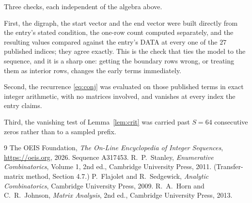 \documentclass[11pt,a4paper]{article}
\theoremstyle{plain}
\theoremstyle{definition}
\begin{document}
Three checks, each independent of the algebra above.

First, the digraph, the start vector and the end vector were built directly from the
entry's stated condition, the one-row count computed separately, and the resulting values
compared against the entry's DATA at every one of the $27$ published indices; they
agree exactly. This is the check that ties the model to the sequence, and it is a sharp one:
getting the boundary rows wrong, or treating them as interior rows, changes the early terms
immediately.

Second, the recurrence \eqref{eq:conj} was evaluated on those published terms in exact
integer arithmetic, with no matrices involved, and vanishes at every index the entry claims.

Third, the vanishing test of Lemma~\ref{lem:crit} was carried past $S=64$ consecutive
zeros rather than to a sampled prefix.

\begin{thebibliography}{9}
 The OEIS Foundation, \emph{The On-Line Encyclopedia of Integer
Sequences}, \url{https://oeis.org}, 2026. Sequence A317453.
 R.~P.~Stanley, \emph{Enumerative Combinatorics}, Volume 1, 2nd ed.,
Cambridge University Press, 2011. (Transfer-matrix method, Section 4.7.)
 P.~Flajolet and R.~Sedgewick, \emph{Analytic Combinatorics}, Cambridge
University Press, 2009.
 R.~A.~Horn and C.~R.~Johnson, \emph{Matrix Analysis}, 2nd ed., Cambridge
University Press, 2013.
\end{thebibliography}
\end{document}
